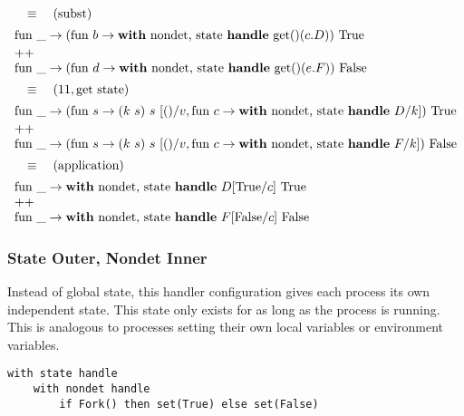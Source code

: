 \documentclass[logo,bsc,singlespacing,parskip]{infthesis}
\begin{document}
\[\begin{array}{l}
\quad\equiv\quad (\text{subst}) \\[5pt]
\text{fun } \_ \rightarrow (\text{fun } b \rightarrow \text{\textbf{with} nondet, state \textbf{handle} get()}(c.D))\ \text{True} \\[2pt]
 \text{++} \\ \text{fun } \_ \rightarrow (\text{fun } d \rightarrow \text{\textbf{with} nondet, state \textbf{handle} get()}(e.F))\ \text{False} \\[5pt]
\quad\equiv\quad (11, \text{get state}) \\[5pt]
\text{fun } \_ \rightarrow (\text{fun } s \rightarrow (k\ s)\ s\ [()/v, \text{fun } c \rightarrow \text{\textbf{with} nondet, state \textbf{handle} }D/k])\ \text{True} \\[2pt]
 \text{++} \\ \text{fun } \_ \rightarrow (\text{fun } s \rightarrow (k\ s)\ s\ [()/v,  \text{fun } c \rightarrow \text{\textbf{with} nondet, state \textbf{handle} }F/k])\ \text{False} \\[5pt]
\quad\equiv\quad (\text{application}) \\[5pt]
\text{fun } \_ \rightarrow \text{\textbf{with} nondet, state \textbf{handle} } D[\text{True}/c]\ \text{True} \\
\text{++} \\
\text{fun } \_ \rightarrow \text{\textbf{with} nondet, state \textbf{handle} } F[\text{False}/c]\ \text{False}
\end{array}
\]




\subsubsection*{State Outer, Nondet Inner}

Instead of global state, this handler configuration gives each process its own independent state. This state only exists for as long as the process is running. This is analogous to processes setting their own local variables or environment variables. 

\begin{lstlisting}
with state handle
    with nondet handle
        if Fork() then set(True) else set(False)
\end{lstlisting}
\end{document}
